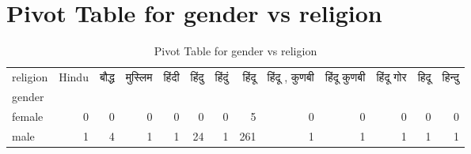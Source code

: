 \documentclass{article}
\begin{document}
\section{Pivot Table for gender vs religion}
\begin{table}
\caption{Pivot Table for gender vs religion}
\label{tab:gender_religion}
\begin{tabular}{lrrrrrrrrrrrr}
\toprule
religion & Hindu & बौद्ध & मुस्लिम & हिंदी & हिंदु & हिंदुं & हिंदू & हिंदू , कुणबी & हिंदू कुणबी & हिंदू गोर & हिदू & हिन्दु \\
gender &  &  &  &  &  &  &  &  &  &  &  &  \\
\midrule
female & 0 & 0 & 0 & 0 & 0 & 0 & 5 & 0 & 0 & 0 & 0 & 0 \\
male & 1 & 4 & 1 & 1 & 24 & 1 & 261 & 1 & 1 & 1 & 1 & 1 \\
\bottomrule
\end{tabular}
\end{table}
\end{document}
